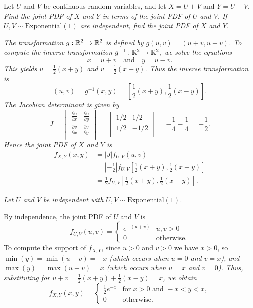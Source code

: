 \begin{example}
Let $U$ and $V$ be continuous random variables, and let $X=U+V$ and $Y=U-V$. 
\ben
\it Find the joint PDF of $X$ and $Y$ in terms of the joint PDF of $U$ and $V$.
\it If $U,V\sim\text{Exponential}(1)$ are independent, find the joint PDF of $X$ and $Y$.
\een
\end{example}

\begin{solution}
\ben

\it %
\bit
\it The transformation $g:\mathbb{R}^2\to\mathbb{R}^2$ is defined by $g(u,v) = (u+v,u-v)$. 
\it To compute the inverse transformation $g^{-1}:\mathbb{R}^2\to\mathbb{R}^2$, we solve the equations
\[
x=u+v \quad\text{and}\quad y=u-v.
\]
\it This yields $u = \frac{1}{2}(x+y)$ and $v = \frac{1}{2}(x-y)$.
\it Thus the inverse transformation is 
\[
(u,v) = g^{-1}(x,y) = \left[\frac{1}{2}(x+y),\frac{1}{2}(x-y)\right].
\]
\eit
The Jacobian determinant is given by
\[
J = 
\begin{vmatrix}
\displaystyle\frac{\partial u}{\partial x} & \displaystyle\frac{\partial u}{\partial y} \\[2ex]
\displaystyle\frac{\partial v}{\partial x} & \displaystyle\frac{\partial v}{\partial y} \\
\end{vmatrix}
=
\begin{vmatrix}
1/2	& 1/2 \\
1/2 & -1/2 \\
\end{vmatrix}
= -\frac{1}{4} - \frac{1}{4} = -\frac{1}{2}.
\]
Hence the joint PDF of $X$ and $Y$ is
\begin{align*}
f_{X,Y}(x,y)
	& = |J|f_{U,V}(u,v) \\
	& = \left|-\frac{1}{2}\right| f_{U,V}\left[\frac{1}{2}(x+y),\frac{1}{2}(x-y)\right] \\
	& = \frac{1}{2}f_{U,V}\left[\frac{1}{2}(x+y),\frac{1}{2}(x-y)\right].
\end{align*}



\it %
Let $U$ and $V$ be independent with $U,V\sim\text{Exponential}(1)$.

By independence, the joint PDF of $U$ and $V$ is 
\[
f_{U,V}(u,v) 
	= \begin{cases}
		e^{-(u+v)}		& u,v > 0 \\
		0				& \text{otherwise.}
\end{cases}
\]
To compute the support of $f_{X,Y}$, since $u>0$ and $v>0$ we have $x>0$, so
\bit
\it $\min(y) = \min(u-v) = -x$ (which occurs when $u=0$ and $v=x$), and
\it $\max(y) = \max(u-v) = x$ (which occurs when $u=x$ and $v=0$).
\eit
Thus, substituting for $u+v = \frac{1}{2}(x+y) + \frac{1}{2}(x-y) = x$, we obtain
\[
f_{X,Y}(x,y) = \begin{cases}
	\frac{1}{2}e^{-x}	& \text{for } x > 0 \text{ and } -x < y < x, \\
	0					& \text{otherwise.}
\end{cases}
\]
\een
\end{solution}


